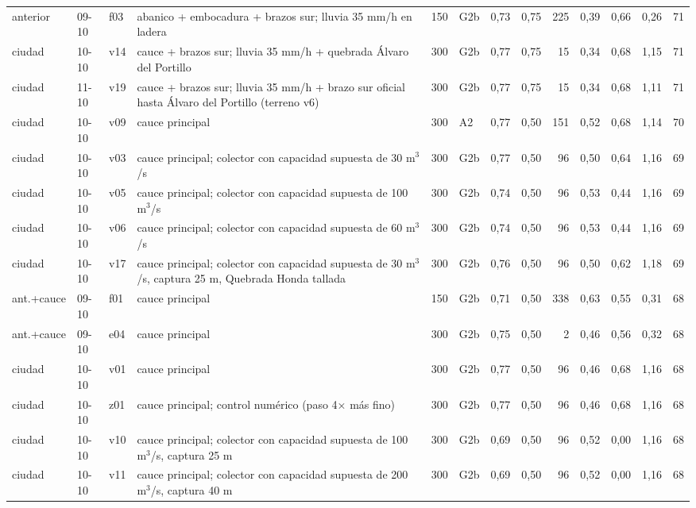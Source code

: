 {\begin{longtable}{lll>{\raggedright\arraybackslash}p{3.3cm}rlrrrrrrr}
anterior & 09-10 & f03 & abanico + embocadura + brazos sur; lluvia 35 mm/h en ladera & 150 & G2b & 0{,}73 & 0{,}75 & 225 & 0{,}39 & 0{,}66 & 0{,}26 & 71\\
ciudad & 10-10 & v14 & cauce + brazos sur; lluvia 35 mm/h + quebrada Álvaro del Portillo & 300 & G2b & 0{,}77 & 0{,}75 & 15 & 0{,}34 & 0{,}68 & 1{,}15 & 71\\
ciudad & 11-10 & v19 & cauce + brazos sur; lluvia 35 mm/h + brazo sur oficial hasta Álvaro del Portillo (terreno v6) & 300 & G2b & 0{,}77 & 0{,}75 & 15 & 0{,}34 & 0{,}68 & 1{,}11 & 71\\
ciudad & 10-10 & v09 & cauce principal & 300 & A2 & 0{,}77 & 0{,}50 & 151 & 0{,}52 & 0{,}68 & 1{,}14 & 70\\
ciudad & 10-10 & v03 & cauce principal; colector con capacidad supuesta de 30 m$^3$/s & 300 & G2b & 0{,}77 & 0{,}50 & 96 & 0{,}50 & 0{,}64 & 1{,}16 & 69\\
ciudad & 10-10 & v05 & cauce principal; colector con capacidad supuesta de 100 m$^3$/s & 300 & G2b & 0{,}74 & 0{,}50 & 96 & 0{,}53 & 0{,}44 & 1{,}16 & 69\\
ciudad & 10-10 & v06 & cauce principal; colector con capacidad supuesta de 60 m$^3$/s & 300 & G2b & 0{,}74 & 0{,}50 & 96 & 0{,}53 & 0{,}44 & 1{,}16 & 69\\
ciudad & 10-10 & v17 & cauce principal; colector con capacidad supuesta de 30 m$^3$/s, captura 25 m, Quebrada Honda tallada & 300 & G2b & 0{,}76 & 0{,}50 & 96 & 0{,}50 & 0{,}62 & 1{,}18 & 69\\
ant.+cauce & 09-10 & f01 & cauce principal & 150 & G2b & 0{,}71 & 0{,}50 & 338 & 0{,}63 & 0{,}55 & 0{,}31 & 68\\
ant.+cauce & 09-10 & e04 & cauce principal & 300 & G2b & 0{,}75 & 0{,}50 & 2 & 0{,}46 & 0{,}56 & 0{,}32 & 68\\
ciudad & 10-10 & v01 & cauce principal & 300 & G2b & 0{,}77 & 0{,}50 & 96 & 0{,}46 & 0{,}68 & 1{,}16 & 68\\
ciudad & 10-10 & z01 & cauce principal; control numérico (paso 4× más fino) & 300 & G2b & 0{,}77 & 0{,}50 & 96 & 0{,}46 & 0{,}68 & 1{,}16 & 68\\
ciudad & 10-10 & v10 & cauce principal; colector con capacidad supuesta de 100 m$^3$/s, captura 25 m & 300 & G2b & 0{,}69 & 0{,}50 & 96 & 0{,}52 & 0{,}00 & 1{,}16 & 68\\
ciudad & 10-10 & v11 & cauce principal; colector con capacidad supuesta de 200 m$^3$/s, captura 40 m & 300 & G2b & 0{,}69 & 0{,}50 & 96 & 0{,}52 & 0{,}00 & 1{,}16 & 68\\

\end{longtable}}
